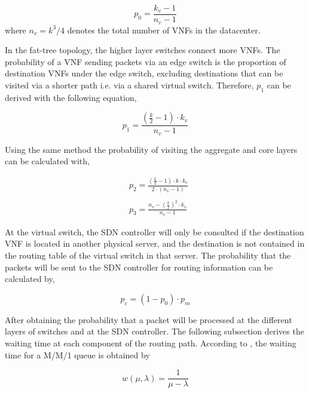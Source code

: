 \begin{equation}
    \label{eq:p_vm}
    p_{0} = \frac{k_{v} - 1}{n_v - 1}
\end{equation}
\noindent where $n_v = k^3/4$ denotes the total number of VNFs in the datacenter.

In the fat-tree topology, the higher layer switches connect more VNFs. The probability of a VNF sending packets via an edge switch is the proportion of destination VNFs under the edge switch, excluding destinations that can be visited via a shorter path i.e. via a shared virtual switch. Therefore, $p_1$ can be derived with the following equation,

\begin{equation}
    \label{eq:p_edge}
    p_{1} = \frac{\left(\frac{k}{2}-1\right) \cdot k_v}{n_v - 1}
\end{equation}

Using the same method the probability of visiting the aggregate and core layers can be calculated with,

\begin{align}
    \label{eq:p_agg_core}
     & p_{2} = \frac{\left(\frac{k}{2}-1\right)\cdot k \cdot k_v }{2 \cdot (n_v-1) } \\ \nonumber \\
     & p_{3} = \frac{n_v - \left(\frac{k}{2}\right)^2 \cdot k_{v}}{n_v - 1}
\end{align}

At the virtual switch, the SDN controller will only be consulted if the destination VNF is located in another physical server, and the destination is not contained in the routing table of the virtual switch in that server. The probability that the packets will be sent to the SDN controller for routing information can be calculated by,

\begin{equation}
    \label{eq:p_sdn}
    p_{c} = (1 - p_{0}) \cdot p_m
\end{equation}

After obtaining the probability that a packet will be processed at the different layers of switches and at the SDN controller. The following subsection derives the waiting time at each component of the routing path. According to \cite{Kleinrock75}, the waiting time for a M/M/1 queue is obtained by

\begin{equation}
    \label{eq:p_latency}
    w(\mu, \lambda) = \frac{1}{\mu - \lambda}
\end{equation}

